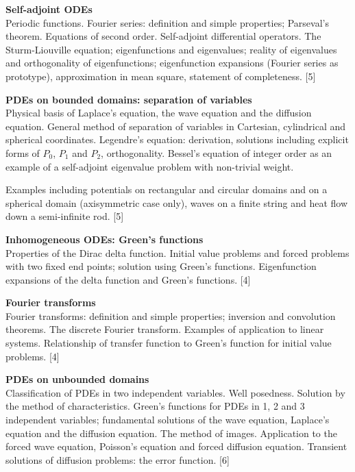 \documentclass[a4paper]{article}
\begin{document}
\maketitle
{\small
\noindent\textbf{Self-adjoint ODEs}\\
Periodic functions. Fourier series: definition and simple properties; Parseval's theorem. Equations of second order. Self-adjoint differential operators. The Sturm-Liouville equation; eigenfunctions and eigenvalues; reality of eigenvalues and orthogonality of eigenfunctions; eigenfunction expansions (Fourier series as prototype), approximation in mean square, statement of completeness.\hspace*{\fill} [5]

\vspace{10pt}
\noindent\textbf{PDEs on bounded domains: separation of variables}\\
Physical basis of Laplace's equation, the wave equation and the diffusion equation. General method of separation of variables in Cartesian, cylindrical and spherical coordinates. Legendre's equation: derivation, solutions including explicit forms of $P_0$, $P_1$ and $P_2$, orthogonality. Bessel's equation of integer order as an example of a self-adjoint eigenvalue problem with non-trivial weight.

\vspace{5pt}
\noindent Examples including potentials on rectangular and circular domains and on a spherical domain (axisymmetric case only), waves on a finite string and heat flow down a semi-infinite rod.\hspace*{\fill} [5]

\vspace{10pt}
\noindent\textbf{Inhomogeneous ODEs: Green's functions}\\
Properties of the Dirac delta function. Initial value problems and forced problems with two fixed end points; solution using Green's functions. Eigenfunction expansions of the delta function and Green's functions.\hspace*{\fill} [4]

\vspace{10pt}
\noindent\textbf{Fourier transforms}\\
Fourier transforms: definition and simple properties; inversion and convolution theorems. The discrete Fourier transform. Examples of application to linear systems. Relationship of transfer function to Green's function for initial value problems.\hspace*{\fill} [4]

\vspace{10pt}
\noindent\textbf{PDEs on unbounded domains}\\
Classification of PDEs in two independent variables. Well posedness. Solution by the method of characteristics. Green's functions for PDEs in 1, 2 and 3 independent variables; fundamental solutions of the wave equation, Laplace's equation and the diffusion equation. The method of images. Application to the forced wave equation, Poisson's equation and forced diffusion equation. Transient solutions of diffusion problems: the error function.\hspace*{\fill} [6]}
\end{document}

